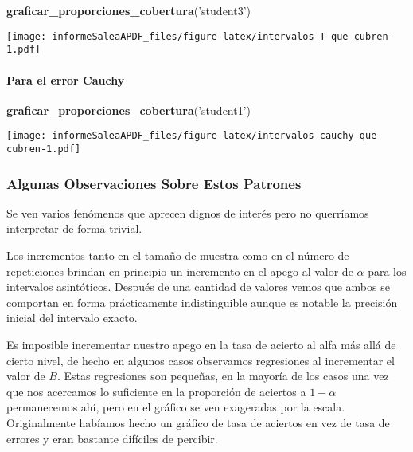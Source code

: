 \documentclass[]{article}
\newenvironment{Shaded}{\begin{snugshade}}{\end{snugshade}}
\newcommand{\KeywordTok}[1]{\textcolor[rgb]{0.13,0.29,0.53}{\textbf{#1}}}
\newcommand{\NormalTok}[1]{#1}
\newcommand{\StringTok}[1]{\textcolor[rgb]{0.31,0.60,0.02}{#1}}
\let\oldparagraph\paragraph
\renewcommand{\paragraph}[1]{\oldparagraph{#1}\mbox{}}
\begin{document}
\begin{Shaded}
\begin{Highlighting}[]
\KeywordTok{graficar_proporciones_cobertura}\NormalTok{(}\StringTok{'student3'}\NormalTok{)}
\end{Highlighting}
\end{Shaded}

\texttt{[image: informeSaleaAPDF\_files/figure-latex/intervalos T que cubren-1.pdf]}

\hypertarget{para-el-error-cauchy}{%
\paragraph{Para el error Cauchy}\label{para-el-error-cauchy}}

\begin{Shaded}
\begin{Highlighting}[]
\KeywordTok{graficar_proporciones_cobertura}\NormalTok{(}\StringTok{'student1'}\NormalTok{)}
\end{Highlighting}
\end{Shaded}

\texttt{[image: informeSaleaAPDF\_files/figure-latex/intervalos cauchy que cubren-1.pdf]}

\hypertarget{algunas-observaciones-sobre-estos-patrones}{%
\subsubsection{Algunas Observaciones Sobre Estos
Patrones}\label{algunas-observaciones-sobre-estos-patrones}}

Se ven varios fenómenos que aprecen dignos de interés pero no querríamos
interpretar de forma trivial.

Los incrementos tanto en el tamaño de muestra como en el número de
repeticiones brindan en principio un incremento en el apego al valor de
\(\alpha\) para los intervalos asintóticos. Después de una cantidad de
valores vemos que ambos se comportan en forma prácticamente
indistinguible aunque es notable la precisión inicial del intervalo
exacto.

Es imposible incrementar nuestro apego en la tasa de acierto al alfa más
allá de cierto nivel, de hecho en algunos casos observamos regresiones
al incrementar el valor de \(B\). Estas regresiones son pequeñas, en la
mayoría de los casos una vez que nos acercamos lo suficiente en la
proporción de aciertos a \(1-\alpha\) permanecemos ahí, pero en el
gráfico se ven exageradas por la escala. Originalmente habíamos hecho un
gráfico de tasa de aciertos en vez de tasa de errores y eran bastante
difíciles de percibir.
\end{document}
